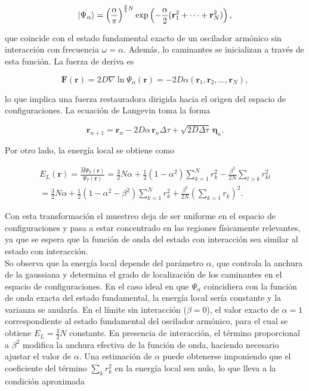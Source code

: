 \documentclass[11pt,a4paper,twoside,pdf]{article}
\numberwithin{equation}{section}
\begin{document}
\begin{equation}
    \ket{\Psi_\alpha} = \left( \frac{\alpha}{\pi} \right)^{\frac{3}{4}N}
    \exp \left( - \frac{\alpha}{2} (\mathbf{r}^2_1 + \cdots +  \mathbf{r}^2_N  )\right),
\end{equation}


que coincide con el estado fundamental exacto de un oscilador armónico sin interacción con frecuencia $\omega=\alpha$. Además, lo caminantes se inicializan a través de esta función. La fuerza de deriva es

\begin{equation}
\mathbf F(\mathbf r)
=
2D \nabla \ln \Psi_\alpha(\mathbf r)
=
-2D\alpha
\left(
\mathbf r_1,\mathbf r_2,\ldots,\mathbf r_N
\right),
\end{equation}

lo que implica una fuerza restauradora dirigida hacia el origen del espacio de configuraciones. La ecuación de Langevin toma la forma

\begin{equation}
\mathbf r_{n+1}
=
\mathbf r_n
-
2D\alpha\,\mathbf r_n \Delta\tau
+
\sqrt{2D\Delta\tau}\,\boldsymbol\eta_n.
\end{equation}


Por otro lado, la energía local se obtiene como

\begin{equation}
\begin{split}
E_L(\mathbf r) = \frac{\hat H \Psi_T(\mathbf r)}{\Psi_T(\mathbf r)} = \frac{3}{2}N\alpha + \frac12(1-\alpha^2)\sum_{k=1}^N r_k^2 - \frac{\beta^2}{2N}\sum_{l>k} r_{kl}^2 \\
= \frac{3}{2}N\alpha + \frac12(1-\alpha^2 - \beta^2)\sum_{k=1}^N r_k^2 + \frac{\beta^2}{2N} \left( \sum_{k=1} r_{k} \right)^2.
\end{split}
\end{equation}






Con esta transformación el muestreo deja de ser uniforme en el espacio de configuraciones y pasa a estar concentrado en las regiones físicamente relevantes, ya que se espera que la función de onda del estado con interacción sea similar al estado con interacción.\\ 

So observa que la energía local depende del parámetro $\alpha$,  que controla la anchura de la gaussiana y determina el grado de localización de los caminantes en el espacio de configuraciones. En el caso ideal en que $\Psi_\alpha$ coincidiera con la función de onda exacta del estado fundamental, la energía local sería constante y la varianza se anularía. En el límite sin interacción ($\beta=0$), el valor exacto de $\alpha=1$ correspondiente al estado fundamental del oscilador armónico, para el cual se obtiene $E_L=\frac{3}{2}N$ constante. En presencia de interacción, el término proporcional a $\beta^2$ modifica la anchura efectiva de la función de onda, haciendo necesario ajustar el valor de $\alpha$. Una estimación de $\alpha$ puede obtenerse imponiendo que el coeficiente del término $\sum_k r_k^2$ en la energía local sea nulo, lo que lleva a la condición aproximada
\end{document}
